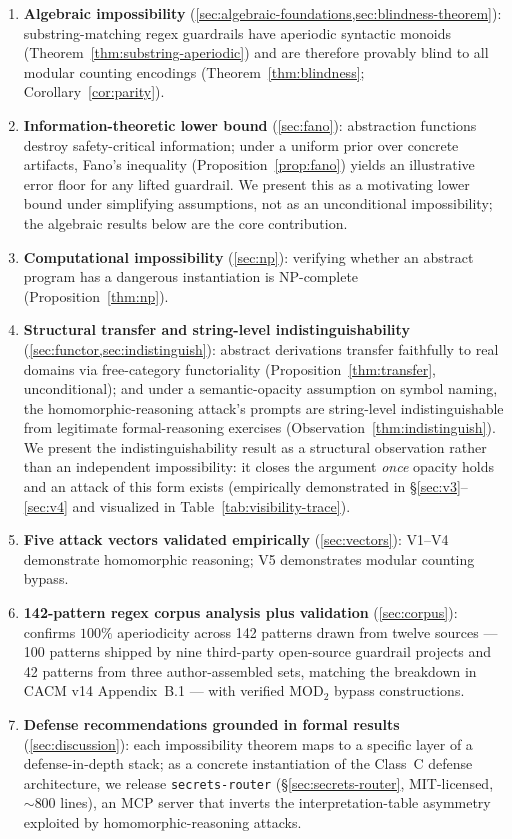 \documentclass[letterpaper,twocolumn,10pt]{article}
\theoremstyle{definition}
\theoremstyle{remark}
\begin{document}
\begin{enumerate}
  \item \textbf{Algebraic impossibility} (\cref{sec:algebraic-foundations,sec:blindness-theorem}):
    substring-matching regex guardrails have aperiodic syntactic monoids
    (Theorem~\ref{thm:substring-aperiodic}) and are therefore provably blind to all
    modular counting encodings (Theorem~\ref{thm:blindness}; Corollary~\ref{cor:parity}).
  \item \textbf{Information-theoretic lower bound} (\cref{sec:fano}):
    abstraction functions destroy safety-critical information; under a uniform
    prior over concrete artifacts, Fano's inequality (Proposition~\ref{prop:fano})
    yields an illustrative error floor for any lifted guardrail. We present this as
    a motivating lower bound under simplifying assumptions, not as an unconditional
    impossibility; the algebraic results below are the core contribution.
  \item \textbf{Computational impossibility} (\cref{sec:np}):
    verifying whether an abstract program has a dangerous instantiation is
    NP-complete (Proposition~\ref{thm:np}).
  \item \textbf{Structural transfer and string-level indistinguishability}
    (\cref{sec:functor,sec:indistinguish}): abstract derivations transfer
    faithfully to real domains via free-category functoriality
    (Proposition~\ref{thm:transfer}, unconditional); and under a
    semantic-opacity assumption on symbol naming, the homomorphic-reasoning
    attack's prompts are string-level indistinguishable from legitimate
    formal-reasoning exercises
    (Observation~\ref{thm:indistinguish}).
    We present the indistinguishability result as a structural observation
    rather than an independent impossibility: it closes the argument
    \emph{once} opacity holds and an attack of this form exists (empirically
    demonstrated in \S\ref{sec:v3}--\ref{sec:v4} and visualized in
    Table~\ref{tab:visibility-trace}).
  \item \textbf{Five attack vectors validated empirically} (\cref{sec:vectors}):
    V1--V4 demonstrate homomorphic reasoning; V5 demonstrates modular counting bypass.
  \item \textbf{142-pattern regex corpus analysis plus validation} (\cref{sec:corpus}):
    confirms $100\%$ aperiodicity across 142 patterns drawn from twelve sources --- 100
    patterns shipped by nine third-party open-source guardrail projects and 42
    patterns from three author-assembled sets, matching the breakdown in CACM
    v14 Appendix~B.1 --- with verified $\mathrm{MOD}_2$ bypass constructions.
  \item \textbf{Defense recommendations grounded in formal results}
    (\cref{sec:discussion}): each impossibility theorem maps to a specific
    layer of a defense-in-depth stack; as a concrete instantiation of the
    Class~C defense architecture, we release \texttt{secrets-router}
    (\S\ref{sec:secrets-router}, MIT-licensed, ${\sim}800$ lines), an MCP
    server that inverts the interpretation-table asymmetry exploited by
    homomorphic-reasoning attacks.
\end{enumerate}
\end{document}
